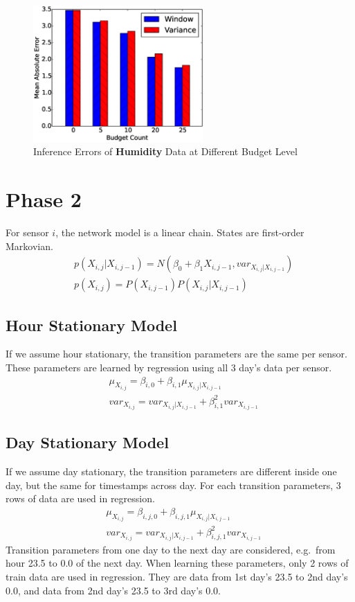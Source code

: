 \documentclass[12pt]{article}  %
\theoremstyle{definition}
\theoremstyle{remark}
\begin{document}
\begin{figure}[H]
\centering
        \includegraphics[width=0.58\textwidth]{../phase1/humidity_err}
        \caption{Inference Errors of \textbf{Humidity} Data at Different Budget Level}
\label{fig:phase1:humidity}
\end{figure}

\section{Phase 2}
For sensor $i$, the network model is a linear chain.
States are first-order Markovian.
\begin{align}
        & p(X_{i,j}|X_{i,j-1}) = N(\beta_0 + \beta_1 X_{i,j-1}, var_{X_{i,j}|X_{i,j-1}}) \\
        & p(X_{i,j}) = P(X_{i, j-1})P(X_{i,j}|X_{i, j-1})
\end{align}

\subsection{Hour Stationary Model}
If we assume hour stationary, the transition parameters are the same per sensor.
These parameters are learned by regression using all 3 day's data per sensor.
\begin{align}
        & \mu_{X_{i,j}} = \beta_{i,0} + \beta_{i,1} \mu_{X_{i,j}|X_{i,j-1}} \\
        & var_{X_{i,j}} = var_{X_{i,j}|X_{i,j-1}} + \beta_{i,1}^2 var_{X_{i,j-1}} 
\end{align}


\subsection{Day Stationary Model}
If we assume day stationary, the transition parameters are different inside one day,
but the same for timestamps across day.
For each transition parameters, 3 rows of data are used in regression.
\begin{align}
        & \mu_{X_{i,j}} = \beta_{i,j,0} + \beta_{i,j,1} \mu_{X_{i,j}|X_{i,j-1}} \\
        & var_{X_{i,j}} = var_{X_{i,j}|X_{i,j-1}} + \beta_{i,j,1}^2 var_{X_{i,j-1}} 
\end{align}
Transition parameters from one day to the next day are considered,
e.g.\ from hour 23.5 to 0.0 of the next day.
When learning these parameters, only 2 rows of train data are used in regression.
They are data from 1st day's 23.5 to 2nd day's 0.0,
and data from 2nd day's 23.5 to 3rd day's 0.0.
\end{document}
